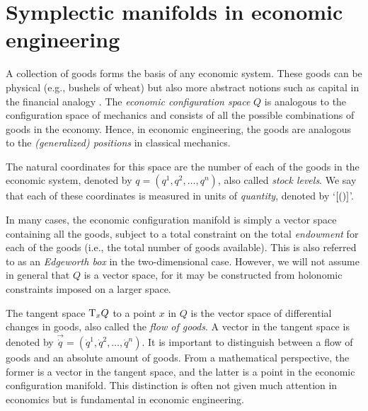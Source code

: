 \section{Symplectic manifolds in economic engineering}
\label{sec:symplectic_ee}
A collection of goods forms the basis of any economic system. These goods can be physical (e.g., bushels of wheat) but also more abstract notions such as capital in the financial analogy \cite{Kruimer2021}. The \emph{economic configuration space} \(Q\) is analogous to the configuration space of mechanics and consists of all the possible combinations of goods in the economy. 
Hence, in economic engineering, the goods are analogous to the \emph{(generalized) positions} in classical mechanics. 

The natural coordinates for this space are the number of each of the goods in the economic system, denoted by \(q = (q^1, q^2, \ldots, q^n)\), also called \emph{stock levels}. We say that each of these coordinates is measured in units of \emph{quantity}, denoted by `\(\qty[\si{\quantity}]\)'. 

In many cases, the economic configuration manifold is simply a vector space containing all the goods, subject to a total constraint on the total \emph{endowment} for each of the goods (i.e., the total number of goods available). This is also referred to as an \emph{Edgeworth box} in the two-dimensional case. However, we will not assume in general that $Q$ is a vector space, for it may be constructed from holonomic constraints imposed on a larger space.

The tangent space \(\mathrm{T}_{x} Q\) to a point \(x\) in \(Q\) is the vector space of differential changes in goods, also called the \emph{flow of goods}. A vector in the tangent space is denoted by \(\vec{\dot{q}} = (\dot{q}^1, \dot{q}^2, \ldots, \dot{q}^n)\). It is important to distinguish between a flow of goods and an absolute amount of goods. From a mathematical perspective, the former is a vector in the tangent space, and the latter is a point in the economic configuration manifold. This distinction is often not given much attention in economics but is fundamental in economic engineering.

